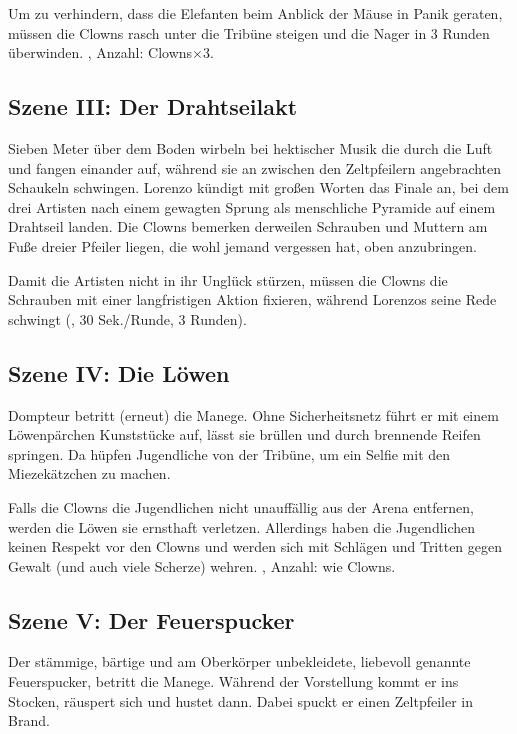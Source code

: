 {		Um zu verhindern, dass die Elefanten beim Anblick der Mäuse in Panik geraten, müssen die Clowns rasch unter die Tribüne steigen und die Nager in 3 Runden überwinden. , Anzahl: Clowns×3.


		\subsection{Szene III: Der Drahtseilakt}

		Sieben Meter über dem Boden wirbeln bei hektischer Musik die  durch die Luft und fangen einander auf, während sie an zwischen den Zeltpfeilern angebrachten Schaukeln schwingen. Lorenzo kündigt mit großen Worten das Finale an, bei dem drei Artisten nach einem gewagten Sprung als menschliche Pyramide auf einem Drahtseil landen. Die Clowns bemerken derweilen Schrauben und Muttern am Fuße dreier Pfeiler liegen, die wohl jemand vergessen hat, oben anzubringen.

		Damit die Artisten nicht in ihr Unglück stürzen, müssen die Clowns die Schrauben mit einer langfristigen Aktion fixieren, während Lorenzos seine Rede schwingt (, 30 Sek./Runde, 3 Runden).

		\subsection{Szene IV: Die Löwen}

		Dompteur  betritt (erneut) die Manege. Ohne Sicherheitsnetz führt er mit einem Löwenpärchen Kunststücke auf, lässt sie brüllen und durch brennende Reifen springen. Da hüpfen Jugendliche von der Tribüne, um ein Selfie mit den Miezekätzchen zu machen.

		Falls die Clowns die Jugendlichen nicht unauffällig aus der Arena entfernen, werden die Löwen sie ernsthaft verletzen. Allerdings haben die Jugendlichen keinen Respekt vor den Clowns und werden sich mit Schlägen und Tritten gegen Gewalt (und auch viele Scherze) wehren. , Anzahl: wie Clowns.

		\subsection{Szene V: Der Feuerspucker}

		Der stämmige, bärtige und am Oberkörper unbekleidete, liebevoll  genannte Feuerspucker, betritt die Manege. Während der Vorstellung kommt er ins Stocken, räuspert sich und hustet dann. Dabei spuckt er einen Zeltpfeiler in Brand.

}
